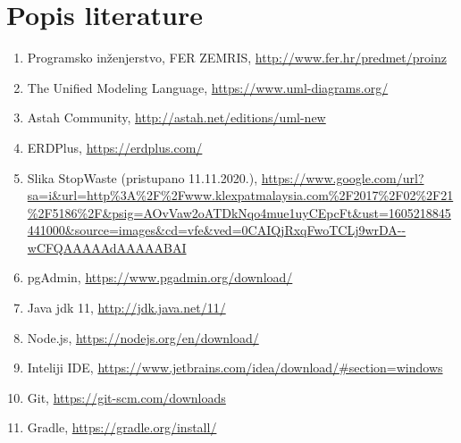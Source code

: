 \chapter*{Popis literature}
	 	
 		
		
		
		\begin{enumerate}
			
			
			\item  Programsko inženjerstvo, FER ZEMRIS, \url{http://www.fer.hr/predmet/proinz}
			
			\item  The Unified Modeling Language, \url{https://www.uml-diagrams.org/}
			
			\item  Astah Community, \url{http://astah.net/editions/uml-new}
			
			\item ERDPlus,
			\url{https://erdplus.com/}
			
			\item Slika StopWaste (pristupano 11.11.2020.), 
			\url{https://www.google.com/url?sa=i&url=http\%3A\%2F\%2Fwww.klexpatmalaysia.com\%2F2017\%2F02\%2F21\%2F5186\%2F&psig=AOvVaw2oATDkNqo4mue1uyCEpcFt&ust=1605218845441000&source=images&cd=vfe&ved=0CAIQjRxqFwoTCLj9wrDA--wCFQAAAAAdAAAAABAI
			}
		
			\item  pgAdmin,
			 \url{https://www.pgadmin.org/download/}
			 
			 \item  Java jdk 11,
			 \url{http://jdk.java.net/11/}
			 
			 \item  Node.js,
			 \url{https://nodejs.org/en/download/}
			 			 
			 \item  Inteliji IDE,
			 \url{https://www.jetbrains.com/idea/download/#section=windows}
			 
			 \item  Git,
			 \url{https://git-scm.com/downloads}
			 
			 \item  Gradle,
			 \url{https://gradle.org/install/}
			 
			 

			 
		
			
		\end{enumerate}
		
		 